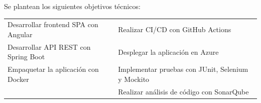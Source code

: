\noindent Se plantean los siguientes objetivos técnicos:


\begin{table}[H]
\centering
\small
\begin{tabularx}{\textwidth}{@{} p{} p{} @{}}
\textbullet{} Desarrollar frontend SPA con Angular & \textbullet{} Realizar CI/CD con GitHub Actions \\
\textbullet{} Desarrollar API REST con Spring Boot & \textbullet{} Desplegar la aplicación en Azure \\
\textbullet{} Empaquetar la aplicación con Docker & \textbullet{} Implementar pruebas con JUnit, Selenium y Mockito \\
& \textbullet{} Realizar análisis de código con SonarQube \\
\end{tabularx}
\end{table}
